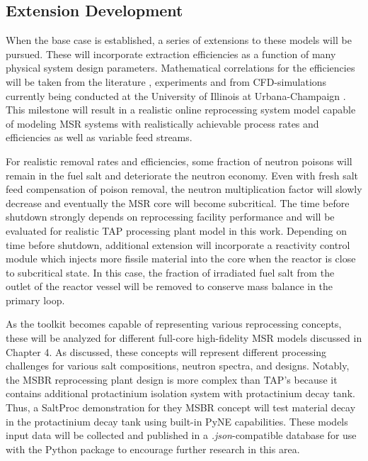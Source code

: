 \subsection{Extension Development}
When the base case is established, a series of extensions to 
these models will be pursued. These will incorporate extraction 
efficiencies as a function of many physical system design 
parameters. Mathematical correlations for the efficiencies will 
be taken from the literature \cite{gabbard_development_1974}, 
experiments and from CFD-simulations currently being conducted at 
the University of Illinois at Urbana-Champaign \cite{huff_enabling_2018}.
This milestone will result in a realistic online reprocessing system 
model capable of modeling \gls{MSR} systems with realistically achievable 
process rates and efficiencies as well as variable feed streams. 

For realistic removal rates and efficiencies, some fraction of neutron 
poisons will remain in the fuel salt and deteriorate the neutron 
economy. Even with fresh salt feed compensation of poison removal, 
the neutron multiplication factor will slowly decrease and 
eventually the \gls{MSR} core will become subcritical. The time before 
shutdown strongly depends on reprocessing facility performance 
and will be evaluated for realistic \gls{TAP} processing plant model 
in this work. Depending on time before shutdown, additional 
extension will 
incorporate a reactivity control module which injects more fissile 
material into the core when the reactor is close to subcritical state. 
In this case, the fraction of irradiated fuel salt from the outlet of 
the reactor vessel will be removed to conserve mass balance in the 
primary loop.

As the toolkit becomes capable of representing various reprocessing 
concepts, these will be analyzed for different full-core 
high-fidelity \gls{MSR} models discussed in Chapter 4. As discussed, 
these concepts will represent different processing challenges 
for various salt compositions, neutron spectra, and designs. 
Notably, the \gls{MSBR} reprocessing plant design is more complex 
than \gls{TAP}'s because it contains additional protactinium 
isolation system with protactinium decay tank. Thus, a SaltProc 
demonstration for they \gls{MSBR} concept will test material decay 
in the protactinium decay tank using built-in PyNE capabilities. 
These models input data will be collected and 
published in a \textit{.json}-compatible database for use with the 
Python package to encourage further research in this area.


